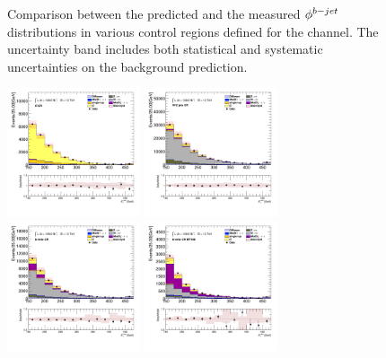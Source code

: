 \begin{figure}[!htp]
\begin{center}
			\end{center}
			\caption{
			Comparison between the predicted and the measured $\phi^{b-jet}$ distributions in various control regions defined for the \taujets channel. The uncertainty band includes both statistical and systematic uncertainties on the background prediction. 
			}
			\label{fig:bkg-bjet-phi-taujets}
		\end{figure}

		\begin{figure}[!htp]
			\begin{center}    
			\includegraphics[width=0.35\textwidth]{chapters/chapter6_HPlus/images/taujets/met_et_TTBAR.png}
			\includegraphics[width=0.35\textwidth]{chapters/chapter6_HPlus/images/taujets/met_et_WJETS.png} \\
			\includegraphics[width=0.35\textwidth]{chapters/chapter6_HPlus/images/taujets/met_et_BVETO.png}
			\includegraphics[width=0.35\textwidth]{chapters/chapter6_HPlus/images/taujets/met_et_BVETO_MT100.png} \\

\end{center}
\end{figure}
